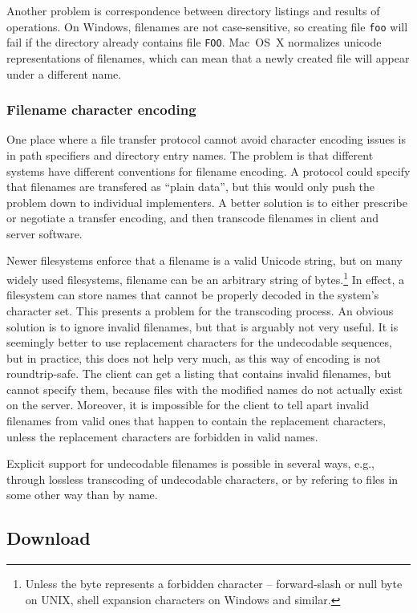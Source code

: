Another problem is correspondence between directory listings and results of operations. On Windows, filenames
are not case-sensitive, so creating file {\tt foo} will fail if the directory already contains file {\tt FOO}.
Mac~OS~X normalizes unicode representations of filenames, which can mean that a newly created file will appear
under a different name.

\subsubsection{Filename character encoding}

One place where a file transfer protocol cannot avoid character encoding issues is in path specifiers and
directory entry names. The problem is that different systems have different conventions for filename encoding.
A protocol could specify that filenames are transfered as ``plain data'', but this would only push the problem
down to individual implementers. A better solution is to either prescribe or negotiate a transfer encoding,
and then transcode filenames in client and server software.

Newer filesystems enforce that a filename is a valid Unicode string, but on many widely used filesystems,
filename can be an arbitrary string of bytes.\footnote{Unless the byte represents a forbidden character --
forward-slash or null byte on UNIX, shell expansion characters on Windows and similar.} In effect,
a filesystem can store names that cannot be properly decoded in the system's character set. This presents
a problem for the transcoding process.  An obvious solution is to ignore invalid filenames, but that is
arguably not very useful. It is seemingly better to use replacement characters for the undecodable sequences,
but in practice, this does not help very much, as this way of encoding is not roundtrip-safe. The client can
get a listing that contains invalid filenames, but cannot specify them, because files with the modified names
do not actually exist on the server. Moreover, it is impossible for the client to tell apart invalid filenames
from valid ones that happen to contain the replacement characters, unless the replacement characters are
forbidden in valid names.

Explicit support for undecodable filenames is possible in several ways, e.g., through lossless transcoding of
undecodable characters, or by refering to files in some other way than by name.


\subsection{Download}

